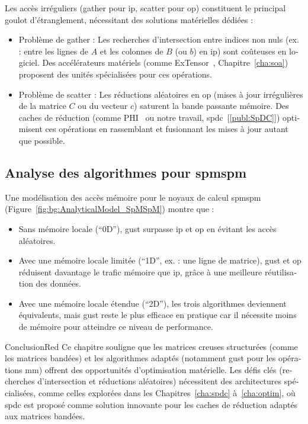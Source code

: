 \begin{otherlanguage}{french}
Les accès irréguliers (\gls{gather} pour \acrshort{ip}, \gls{scatter} pour \acrshort{op}) constituent le principal goulot d'étranglement, nécessitant des solutions matérielles dédiées :
\begin{itemize}
    \item Problème de \gls{gather} : Les recherches d'intersection entre indices non nuls (ex. : entre les lignes de $A$ et les colonnes de $B$ (ou $b$) en \acrshort{ip}) sont coûteuses en logiciel.
    Des accélérateurs matériels (comme ExTensor~\cite{Hegde2019_ExTensor}, Chapitre~\ref{cha:soa}) proposent des unités spécialisées pour ces opérations.
    \item Problème de \gls{scatter} : Les réductions aléatoires en \acrshort{op} (mises à jour irrégulières de la matrice $C$ ou du vecteur $c$) saturent la bande passante mémoire.
    Des caches de réduction (comme PHI~\cite{Mukkara2019_PHI} ou notre travail, \acrlong{spdc}~[\ref{publ:SpDC}]) optimisent ces opérations en rassemblant et fusionnant les mises à jour autant que possible.
\end{itemize}

\subsection*{Analyse des algorithmes pour \acrshort{spmspm}}

Une modélisation des accès mémoire pour le noyaux de calcul \acrshort{spmspm} (Figure~\ref{fig:bg:AnalyticalModel_SpMSpM}) montre que :
\begin{itemize}
    \item Sans mémoire locale (``0D''), \acrshort{gust} surpasse \acrshort{ip} et \acrshort{op} en évitant les accès aléatoires.
    \item Avec une mémoire locale limitée (``1D'', ex. : une ligne de matrice), \acrshort{gust} et \acrshort{op} réduisent davantage le trafic mémoire que \acrshort{ip}, grâce à une meilleure réutilisation des données.
    \item Avec une mémoire locale étendue (``2D''), les trois algorithmes deviennent équivalents, mais \acrshort{gust} reste le plus efficace en pratique car il nécessite moins de mémoire pour atteindre ce niveau de performance.
\end{itemize}

\bigskip
\begin{highlight}{Conclusion}{Red}
    Ce chapitre souligne que les matrices creuses structurées (comme les matrices bandées) et les algorithmes adaptés (notamment \acrshort{gust} pour les opérations \acrshort{mm}) offrent des opportunités d'optimisation matérielle.
    Les défis clés (recherches d'intersection et réductions aléatoires) nécessitent des architectures spécialisées, comme celles explorées dans les Chapitres~\ref{cha:spdc} à~\ref{cha:optim}, où \acrlong{spdc} est proposé comme solution innovante pour les caches de réduction adaptés aux matrices bandées.
\end{highlight}


\end{otherlanguage}
